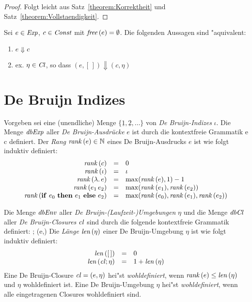 \documentclass[12pt,fleqn]{article}
\newcommand{\Cl}{\name{Cl}}
\newcommand{\cl}{\name{cl}}
\begin{document}
\begin{proof}
  Folgt leicht aus Satz~\ref{theorem:Korrektheit} und Satz~\ref{theorem:Vollstaendigkeit}.
\end{proof}

\begin{corollary}
  Sei $e \in {\text{\it Exp\/}}$, $c \in {\text{\it Const\/}}$ mit ${\text{\it free\/}}\,(e) = \emptyset$. Die folgenden Aussagen sind "aquivalent:
  \begin{enumerate}
    \item $e \Downarrow c$
    \item ex. $\eta\in\Cl$, so dass $(e,[\,]) \Downarrow (c,\eta)$
  \end{enumerate}
\end{corollary}


\section{De Bruijn Indizes}

\begin{definition}[Expressions]
  Vorgeben sei eine (unendliche) Menge $\{\underline{1},\underline{2},\ldots\}$ von {\em De Bruijn-Indizes}
  $\iota$. Die Menge ${\text{\it dbExp\/}}$ aller {\em De Bruijn-Ausdr\"ucke} $e$ ist durch die kontextfreie Grammatik
  \bgram
  e \is c \mid \iota \mid {} \mid {} \mid {}
  \egram
  definiert. Der {\em Rang} ${\text{\it rank\/}}\,(e) \in {\mathord{\mathbb N}}$ eines De Bruijn-Ausdrucks $e$ ist wie folgt induktiv definiert:
  \[\begin{array}{rcl}
    {\text{\it rank\/}}\,(c) &=& 0 \\
    {\text{\it rank\/}}\,(\iota) &=& \iota \\
    {\text{\it rank\/}}\,(\lambda .\,e) &=& \max({\text{\it rank\/}}\,(e),1) - 1 \\
    {\text{\it rank\/}}\,(e_1\,e_2) &=& \max({\text{\it rank\/}}\,(e_1),{\text{\it rank\/}}\,(e_2)) \\
    {\text{\it rank\/}}\,(\mathbf{if}\ e_0\ \mathbf{then}\ e_1\ \mathbf{else}\ e_2) &=& \max({\text{\it rank\/}}\,(e_0),{\text{\it rank\/}}\,(e_1),{\text{\it rank\/}}\,(e_2))
  \end{array}\]
\end{definition}

\begin{definition}
  Die Menge ${\text{\it dbEnv\/}}$ aller {\em De Bruijn-(Laufzeit-)Umgebungen} $\eta$ und die Menge ${\text{\it dbCl\/}}$ aller
  {\em De Bruijn-Closures} $\cl$ sind durch die folgende kontextfreie Grammatik definiert:
  \bgram
  \eta \is [\,] \mid \cl;\eta \n
  \cl \is (e,\eta)
  \egram
  Die {\em L\"ange} ${\text{\it len\/}}\,(\eta)$ einer De Bruijn-Umgebung $\eta$ ist wie folgt induktiv definiert:
  \[\begin{array}{rcl}
    \len{[\,]} &=& 0 \\
    \len{\cl;\eta} &=& 1 + \len{\eta}
  \end{array}\]
  Eine De Bruijn-Closure $\cl = (e,\eta)$ hei"st {\em wohldefiniert}, wenn ${\text{\it rank\/}}\,(e) \le {\text{\it len\/}}\,(\eta)$ und
  $\eta$ wohldefiniert ist. Eine De Bruijn-Umgebung $\eta$ hei"st {\em wohldefiniert}, wenn alle eingetragenen
  Closures wohldefiniert sind.
\end{definition}
\end{document}
